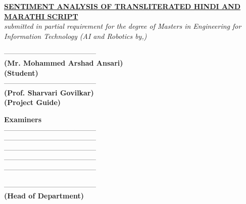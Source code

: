 \documentclass[12pt]{book}
\begin{document}
\newpage
\begin{left}
    \begin{center}
        \fontsize{12}{30}\selectfont \textbf{\underline{SENTIMENT ANALYSIS OF
            TRANSLITERATED HINDI AND MARATHI SCRIPT}}\\
        \fontsize{12}{30}\selectfont \textit{submitted in partial requirement for
        the degree of Masters in Engineering for Information Technology (AI and
        Robotics by,)}\\
    \end{center}
    \vspace{10mm}
    \noindent ---------------------------------------\\
    \fontsize{12}{30}\selectfont \textbf{(Mr. Mohammed Arshad Ansari)}\\
    \fontsize{12}{30}\selectfont \textbf{(Student)}\\
    \noindent ---------------------------------------\\
    \fontsize{12}{30}\selectfont \textbf{(Prof. Sharvari Govilkar)}\\
    \fontsize{12}{30}\selectfont \textbf{(Project Guide)}\\
    \vspace{10mm}
    \begin{center}
    \fontsize{12}{30}\selectfont \textbf{Examiners} \\
    \noindent ---------------------------------------\\
    \noindent ---------------------------------------\\
    \noindent ---------------------------------------\\
    \noindent ---------------------------------------\\
    \noindent ---------------------------------------\\
    \vspace{10mm}
    \end{center}
    \noindent ---------------------------------------\\
    \fontsize{12}{30}\selectfont \textbf{(Head of Department)} \\

\end{left}
\restoregeometry
\end{document}
